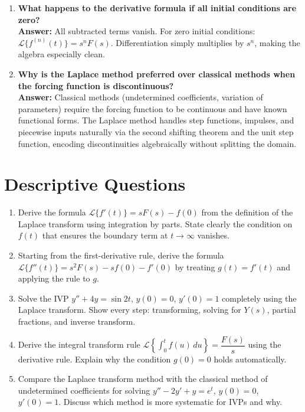 \documentclass[12pt,a4paper]{article}
\begin{document}
\begin{enumerate}[label=\textbf{Q\arabic*.}]
\item \textbf{What happens to the derivative formula if all initial conditions are zero?}\\
      \textbf{Answer:} All subtracted terms vanish.
      For zero initial conditions: \(\mathcal{L}\{f^{(n)}(t)\} = s^n F(s)\).
      Differentiation simply multiplies by \(s^n\), making the algebra especially clean.

\item \textbf{Why is the Laplace method preferred over classical methods when the forcing function is discontinuous?}\\
      \textbf{Answer:} Classical methods (undetermined coefficients, variation of parameters)
      require the forcing function to be continuous and have known functional forms.
      The Laplace method handles step functions, impulses, and piecewise inputs naturally
      via the second shifting theorem and the unit step function, encoding discontinuities
      algebraically without splitting the domain.

\end{enumerate}

\section{Descriptive Questions}

\begin{enumerate}[label=\textbf{D\arabic*.}]

\item Derive the formula \(\mathcal{L}\{f'(t)\} = sF(s) - f(0)\) from the definition of the
      Laplace transform using integration by parts.
      State clearly the condition on \(f(t)\) that ensures the boundary term at \(t\to\infty\)
      vanishes.

\item Starting from the first-derivative rule, derive the formula
      \(\mathcal{L}\{f''(t)\} = s^2F(s) - sf(0) - f'(0)\) by treating \(g(t)=f'(t)\)
      and applying the rule to \(g\).

\item Solve the IVP \(y'' + 4y = \sin 2t\), \(y(0)=0\), \(y'(0)=1\) completely using
      the Laplace transform.
      Show every step: transforming, solving for \(Y(s)\), partial fractions,
      and inverse transform.

\item Derive the integral transform rule
      \(\mathcal{L}\!\left\{\int_0^t f(u)\,du\right\} = \dfrac{F(s)}{s}\)
      using the derivative rule.
      Explain why the condition \(g(0)=0\) holds automatically.

\item Compare the Laplace transform method with the classical method of undetermined
      coefficients for solving \(y'' - 2y' + y = e^t\), \(y(0)=0\), \(y'(0)=1\).
      Discuss which method is more systematic for IVPs and why.

\end{enumerate}
\end{document}
